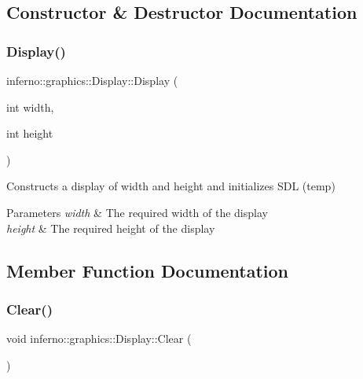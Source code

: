 \subsection{Constructor \& Destructor Documentation}
\mbox{\label{classinferno_1_1graphics_1_1_display_a8209b018b72b97990c10e67054ef813e}} 
\subsubsection{\texorpdfstring{Display()}{Display()}}
{\footnotesize\ttfamily inferno\+::graphics\+::\+Display\+::\+Display (\begin{DoxyParamCaption}\item[{int}]{width,  }\item[{int}]{height }\end{DoxyParamCaption})\hspace{0.3cm}{\ttfamily [inline]}}



Constructs a display of width and height and initializes S\+DL (temp) 


\begin{DoxyParams}{Parameters}
{\em width} & The required width of the display \\
\hline
{\em height} & The required height of the display \\
\hline
\end{DoxyParams}


\subsection{Member Function Documentation}
\mbox{\label{classinferno_1_1graphics_1_1_display_aabd8a093188d59ac2399abd66e5f00d8}} 
\subsubsection{\texorpdfstring{Clear()}{Clear()}}
{\footnotesize\ttfamily void inferno\+::graphics\+::\+Display\+::\+Clear (\begin{DoxyParamCaption}{ }\end{DoxyParamCaption})\hspace{0.3cm}{\ttfamily [inline]}}



